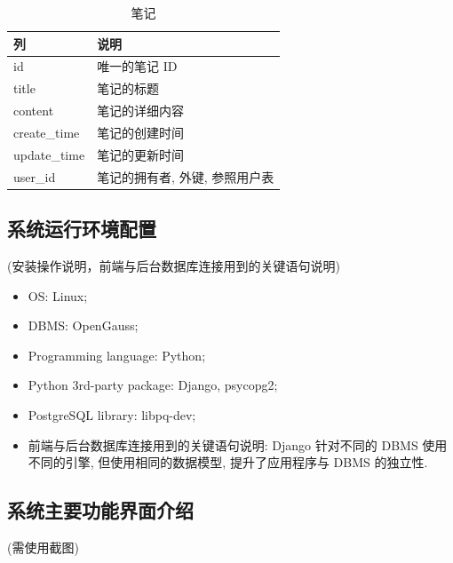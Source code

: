 \begin{table}[H]
  \caption{笔记}
  \begin{center}
    \begin{tabular}[c]{ll}
      \hline
      列 & 说明 \\
      \hline
      id & 唯一的笔记 ID \\
      title & 笔记的标题 \\
      content & 笔记的详细内容 \\
      create\_time & 笔记的创建时间 \\
      update\_time & 笔记的更新时间 \\
      user\_id & 笔记的拥有者, 外键, 参照用户表 \\
      \hline
    \end{tabular}
  \end{center}
\end{table}

\subsection{系统运行环境配置}
(安装操作说明，前端与后台数据库连接用到的关键语句说明)

\begin{itemize}
  \item OS: Linux;
  \item DBMS: OpenGauss;
  \item Programming language: Python;
  \item Python 3rd-party package: Django, psycopg2;
  \item PostgreSQL library: libpq-dev;
  \item 前端与后台数据库连接用到的关键语句说明: Django 针对不同的 DBMS
    使用不同的引擎, 但使用相同的数据模型, 提升了应用程序与 DBMS 的独立性.
\end{itemize}

\subsection{系统主要功能界面介绍}
(需使用截图)

